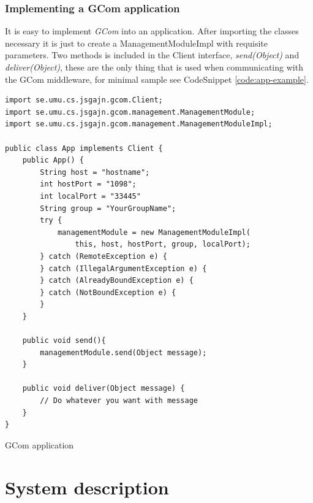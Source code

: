 \documentclass[titlepage, twocolumn, a4paper, 10pt]{article}
\begin{document}
\subsubsection{Implementing a GCom application}\label{sec:implgcom}
It is easy to implement \textit{GCom} into an application. After
importing the classes necessary it is just to create a
ManagementModuleImpl with requisite parameters. Two methods is
included in the Client interface, \textit{send(Object)} and
\textit{deliver(Object)}, these are the only thing that is used when
communicating with the GCom middleware, for minimal sample see
CodeSnippet \ref{code:app-example}.
\begin{code}
  \begin{footnotesize}
\begin{verbatim}
import se.umu.cs.jsgajn.gcom.Client;
import se.umu.cs.jsgajn.gcom.management.ManagementModule;
import se.umu.cs.jsgajn.gcom.management.ManagementModuleImpl;

public class App implements Client {    
    public App() {
        String host = "hostname";
        int hostPort = "1098";
        int localPort = "33445"
        String group = "YourGroupName";
        try {
            managementModule = new ManagementModuleImpl(
                this, host, hostPort, group, localPort);
        } catch (RemoteException e) {
        } catch (IllegalArgumentException e) {
        } catch (AlreadyBoundException e) {
        } catch (NotBoundException e) {
        }
    }
    
    public void send(){
        managementModule.send(Object message);
    }

    public void deliver(Object message) {
        // Do whatever you want with message
    }
}
\end{verbatim}
  \end{footnotesize}
  \caption{GCom application}
  \label{code:app-example}
\end{code}


\section{System description}\label{sec:system}

\end{document}

